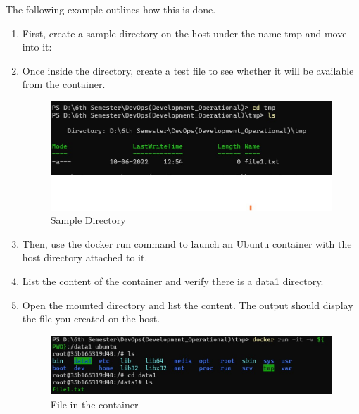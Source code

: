 \documentclass[12pt]{article}
\begin{document}
The following example outlines how this is done.

\begin{enumerate}
\item First, create a sample directory on the host under the name tmp and move into it:

\item Once inside the directory, create a test file to see whether it will be available from the container.

\begin{figure}[H]
\centering
\includegraphics[scale=0.6]{fig50}
\caption{Sample Directory}
\vspace{0.6\baselineskip}
\end{figure}

\item Then, use the docker run command to launch an Ubuntu container with the host directory attached to it.

\item List the content of the container and verify there is a data1 directory.

\item Open the mounted directory and list the content. The output should display the file you created on the host.

\begin{figure}[H]
\centering
\includegraphics[scale=0.8]{fig51}
\caption{File in the container}
\vspace{0.6\baselineskip}
\end{figure}

\end{enumerate}
\end{document}
